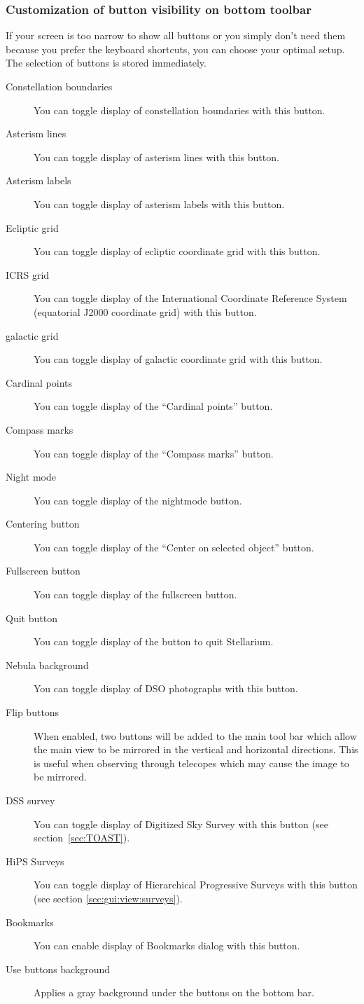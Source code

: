 \subsubsection{Customization of button visibility on bottom toolbar}
If your screen is too narrow to show all buttons
or you simply don't need them because you prefer the keyboard shortcuts,
you can choose your optimal setup. The selection of buttons is stored immediately. 
\begin{description}
\item[Constellation boundaries] You can toggle display of constellation boundaries with this button.
\item[Asterism lines] You can toggle display of asterism lines with this button.
\item[Asterism labels] You can toggle display of asterism labels with this button.
\item[Ecliptic grid] You can toggle display of ecliptic coordinate grid with this button.
\item[ICRS grid] You can toggle display of the International Coordinate Reference System (equatorial J2000 coordinate grid) with this button.
\item[galactic grid] You can toggle display of galactic coordinate grid with this button.
\item[Cardinal points] You can toggle display of the ``Cardinal points'' button.
\item[Compass marks] You can toggle display of the ``Compass marks'' button.
\item[Night mode] You can toggle display of the nightmode button.
\item[Centering button] You can toggle display of the ``Center on selected object'' button.
\item[Fullscreen button] You can toggle display of the fullscreen button.
\item[Quit button] You can toggle display of the button to quit Stellarium.
\item[Nebula background] You can toggle display of DSO photographs with this button.
\item[Flip buttons] When enabled, two buttons will be added to
  the main tool bar which allow the main view to be mirrored in the
  vertical and horizontal directions. This is useful when observing
  through telecopes which may cause the image to be mirrored.
\item[DSS survey] You can toggle display of Digitized Sky Survey with this button (see section~\ref{sec:TOAST}).
\item[HiPS Surveys] You can toggle display of Hierarchical Progressive Surveys with this button (see section \ref{sec:gui:view:surveys}).
\item[Bookmarks] You can enable display of Bookmarks dialog with this button.
\item[Use buttons background] Applies a gray background under the buttons on the bottom bar.
\end{description}


